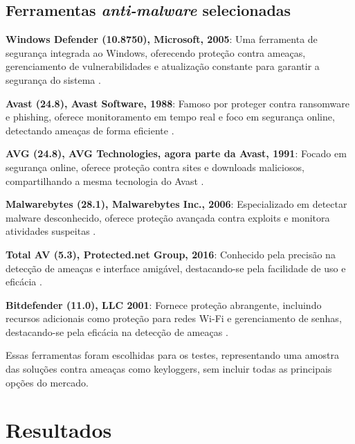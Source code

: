 \documentclass[12pt]{article}
\begin{document}
\subsection{Ferramentas \textit{anti-malware} selecionadas}

\textbf{Windows Defender (10.8750), Microsoft, 2005}: Uma ferramenta de segurança integrada ao Windows, oferecendo proteção contra ameaças, gerenciamento de vulnerabilidades e atualização constante para garantir a segurança do sistema \citep{MicrosoftSecurityBlog}.

\textbf{Avast (24.8), Avast Software, 1988}: Famoso por proteger contra ransomware e phishing, oferece monitoramento em tempo real e foco em segurança online, detectando ameaças de forma eficiente \citep{Avast}.

\textbf{AVG (24.8), AVG Technologies, agora parte da Avast, 1991}: Focado em segurança online, oferece proteção contra sites e downloads maliciosos, compartilhando a mesma tecnologia do Avast \citep{AVG}.

\textbf{Malwarebytes (28.1), Malwarebytes Inc., 2006}: Especializado em detectar malware desconhecido, oferece proteção avançada contra exploits e monitora atividades suspeitas \citep{Malwarebytes}.

\textbf{Total AV (5.3), Protected.net Group, 2016}: Conhecido pela precisão na detecção de ameaças e interface amigável, destacando-se pela facilidade de uso e eficácia \citep{TotalAV}.

\textbf{Bitdefender (11.0), LLC 2001}: Fornece proteção abrangente, incluindo recursos adicionais como proteção para redes Wi-Fi e gerenciamento de senhas, destacando-se pela eficácia na detecção de ameaças \citep{Bitdefender}.

Essas ferramentas foram escolhidas para os testes, representando uma amostra das soluções contra ameaças como keyloggers, sem incluir todas as principais opções do mercado.

\section{Resultados}
\end{document}
